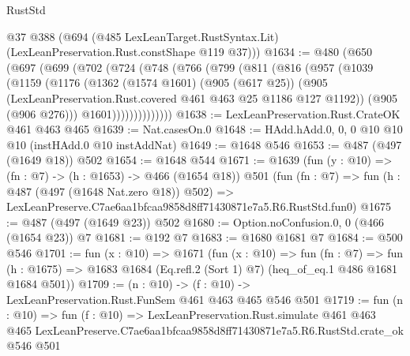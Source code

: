 \begin{lexlean}{RustStd}
\begin{coremodule}
      @37
      @388
      (@694 (@485 LexLeanTarget.RustSyntax.Lit) (LexLeanPreservation.Rust.constShape @119 @37)))
@1634 := @480
    (@650
      (@697
        (@699
          (@702
            (@724
              (@748
                (@766
                  (@799
                    (@811
                      (@816
                        (@957
                          (@1039
                            (@1159
                              (@1176
                                (@1362
                                  (@1574 @1601)
                                  (@905 (@617 @25))
                                  (@905
                                    (LexLeanPreservation.Rust.covered
                                      @461
                                      @463
                                      @25
                                      @1186
                                      @127
                                      @1192))
                                  (@905 (@906 @276)))
                                @1601))))))))))))))
@1638 := LexLeanPreservation.Rust.CrateOK @461 @463 @465
@1639 := Nat.casesOn.{0}
@1648 := HAdd.hAdd.{0, 0, 0} @10 @10 @10 (instHAdd.{0} @10 instAddNat)
@1649 := @1648 @546
@1653 := @487 (@497 (@1649 @18)) @502
@1654 := @1648 @544
@1671 := @1639
    (fun (y : @10) => (fn : @7) -> (h : @1653) -> @466 (@1654 @18))
    @501
    (fun (fn : @7) =>
    fun (h : @487 (@497 (@1648 Nat.zero @18)) @502) =>
    LexLeanPreserve.C7ae6aa1bfcaa9858d8ff71430871e7a5.R6.RustStd.fun0)
@1675 := @487 (@497 (@1649 @23)) @502
@1680 := Option.noConfusion.{0, 0} (@466 (@1654 @23)) @7
@1681 := @192 @7
@1683 := @1680 @1681 @7
@1684 := @500 @546
@1701 := fun (x : @10) =>
  @1671
    (fun (x : @10) =>
    fun (fn : @7) =>
    fun (h : @1675) => @1683 @1684 (Eq.refl.{2} (Sort 1) @7) (heq_of_eq.{1} @486 @1681 @1684 @501))
@1709 := (n : @10) -> (f : @10) -> LexLeanPreservation.Rust.FunSem @461 @463 @465 @546 @501
@1719 := fun (n : @10) =>
  fun (f : @10) =>
  LexLeanPreservation.Rust.simulate
    @461
    @463
    @465
    LexLeanPreserve.C7ae6aa1bfcaa9858d8ff71430871e7a5.R6.RustStd.crate_ok
    @546
    @501
\end{coremodule}
\end{lexlean}
